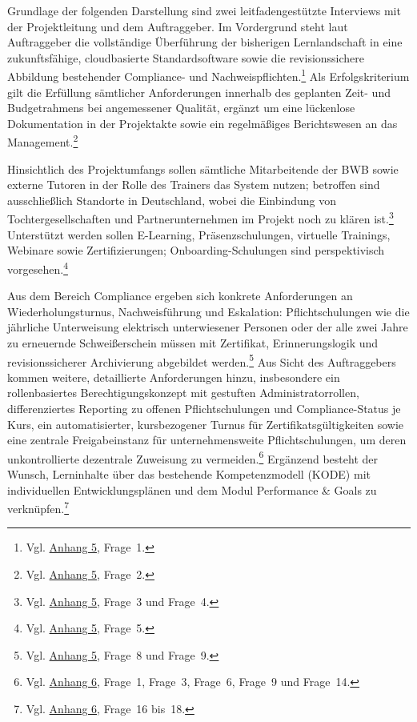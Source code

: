 \documentclass[
    12pt, 
    a4paper,
    ]{scrartcl} %
\begin{document}
Grundlage der folgenden Darstellung sind zwei leitfadengestützte Interviews mit der Projektleitung und dem Auftraggeber. Im Vordergrund steht laut Auftraggeber die vollständige Überführung der bisherigen Lernlandschaft in eine zukunftsfähige, cloudbasierte Standardsoftware sowie die revisionssichere Abbildung bestehender Compliance- und Nachweispflichten.\footnote{Vgl. \hyperref[sec:Anhang5]{Anhang 5}, Frage~1.} Als Erfolgskriterium gilt die Erfüllung sämtlicher Anforderungen innerhalb des geplanten Zeit- und Budgetrahmens bei angemessener Qualität, ergänzt um eine lückenlose Dokumentation in der Projektakte sowie ein regelmäßiges Berichtswesen an das Management.\footnote{Vgl. \hyperref[sec:Anhang5]{Anhang 5}, Frage~2.}

Hinsichtlich des Projektumfangs sollen sämtliche Mitarbeitende der BWB sowie externe Tutoren in der Rolle des Trainers das System nutzen; betroffen sind ausschließlich Standorte in Deutschland, wobei die Einbindung von Tochtergesellschaften und Partnerunternehmen im Projekt noch zu klären ist.\footnote{Vgl. \hyperref[sec:Anhang5]{Anhang 5}, Frage~3 und Frage~4.} Unterstützt werden sollen E-Learning, Präsenzschulungen, virtuelle Trainings, Webinare sowie Zertifizierungen; Onboarding-Schulungen sind perspektivisch vorgesehen.\footnote{Vgl. \hyperref[sec:Anhang5]{Anhang 5}, Frage~5.}

Aus dem Bereich Compliance ergeben sich konkrete Anforderungen an Wiederholungsturnus, Nachweisführung und Eskalation: Pflichtschulungen wie die jährliche Unterweisung elektrisch unterwiesener Personen oder der alle zwei Jahre zu erneuernde Schweißerschein müssen mit Zertifikat, Erinnerungslogik und revisionssicherer Archivierung abgebildet werden.\footnote{Vgl. \hyperref[sec:Anhang5]{Anhang 5}, Frage~8 und Frage~9.} Aus Sicht des Auftraggebers kommen weitere, detaillierte Anforderungen hinzu, insbesondere ein rollenbasiertes Berechtigungskonzept mit gestuften Administratorrollen, differenziertes Reporting zu offenen Pflichtschulungen und Compliance-Status je Kurs, ein automatisierter, kursbezogener Turnus für Zertifikatsgültigkeiten sowie eine zentrale Freigabeinstanz für unternehmensweite Pflichtschulungen, um deren unkontrollierte dezentrale Zuweisung zu vermeiden.\footnote{Vgl. \hyperref[sec:Anhang6]{Anhang 6}, Frage~1, Frage~3, Frage~6, Frage~9 und Frage~14.} Ergänzend besteht der Wunsch, Lerninhalte über das bestehende Kompetenzmodell (KODE) mit individuellen Entwicklungsplänen und dem Modul Performance \& Goals zu verknüpfen.\footnote{Vgl. \hyperref[sec:Anhang6]{Anhang 6}, Frage~16 bis~18.}
\end{document}
